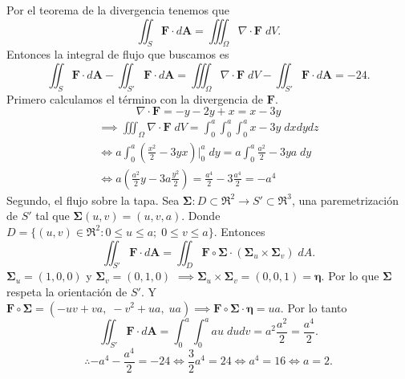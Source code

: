 \begin{solution}
  Por el teorema de la divergencia tenemos que
  \[
    \iint_S \mathbf{F}\cdot d\mathbf{A}=\iiint_\Omega \nabla \cdot \mathbf{F}\;dV.
  \]
  Entonces la integral de flujo que buscamos es
  \[
    \iint_S \mathbf{F}\cdot d\mathbf{A} - \iint_{S'} \mathbf{F}\cdot d\mathbf{A}=
    \iiint_\Omega \nabla \cdot \mathbf{F}\;dV - \iint_{S'} \mathbf{F}\cdot d\mathbf{A}=-24.
  \]
  Primero calculamos el t\'ermino con la divergencia de $\mathbf{F}$.
  \[
    \nabla\cdot\mathbf{F}=-y-2y+x=x-3y
  \]
  \begin{gather*}
    \implies\iiint_\Omega\nabla\cdot\mathbf{F}\;dV=\int_0^a \int_0^a \int_0^a x-3y\;dxdydz\\[.2cm]
    \iff a\int_0^a \left(\frac{x^2}{2}-3yx\right)\Bigg|_0^a\;dy=a\int_0^a \frac{a^2}{2}-3ya\;dy\\[.2cm]
    \iff a\left( \frac{a^2}{2}y-3a\frac{y^2}{2} \right)=\frac{a^4}{2}-3\frac{a^4}{2}=-a^4
  \end{gather*}
  Segundo, el flujo sobre la tapa. Sea $\boldsymbol{\Sigma} : D\subset\Re^2\to S'\subset\Re^3$, una paremetrizaci\'on de $S'$ tal que $\boldsymbol{\Sigma}(u,v)=(u,v,a)$. Donde $D = \{(u,v)\in\Re^2:0\leq u\leq a;\;0\leq v \leq a\}$. Entonces
  \[
    \iint_{S'} \mathbf{F}\cdot d\mathbf{A}=\iint_D \mathbf{F}\circ\boldsymbol{\Sigma} \cdot (\boldsymbol{\Sigma}_u\times\boldsymbol{\Sigma}_v)\;dA.
  \]
  $\boldsymbol{\Sigma}_u=(1,0,0)$ y $\boldsymbol{\Sigma}_v=(0,1,0)$ $\implies \boldsymbol{\Sigma}_u\times\boldsymbol{\Sigma}_v=(0,0,1)=\boldsymbol{\eta}$. Por lo que $\boldsymbol{\Sigma}$ respeta la orientaci\'on de $S'$. Y $\mathbf{F}\circ\boldsymbol{\Sigma}=(-uv+va,\;-v^2+ua,\;ua) \implies \mathbf{F}\circ\boldsymbol{\Sigma}\cdot\boldsymbol{\eta}=ua$. Por lo tanto
  \[
    \iint_{S'} \mathbf{F}\cdot d\mathbf{A}=\int_0^a\int_0^a au\;dudv=a^2\frac{a^2}{2}=\frac{a^4}{2}.
  \]
  \[
    \therefore -a^4-\frac{a^4}{2}=-24\iff \frac{3}{2}a^4=24\iff a^4=16 \iff a=2.
  \]

\end{solution}


